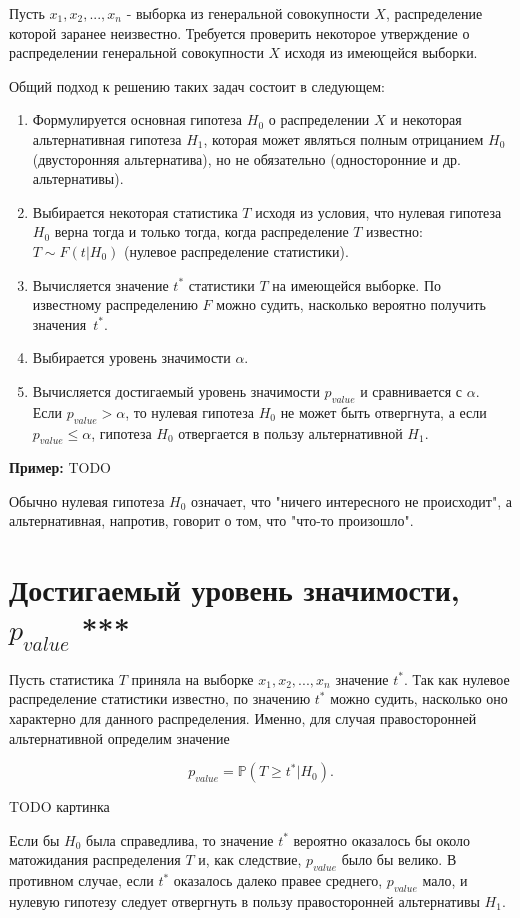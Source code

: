 Пусть $x_1, x_2, ..., x_n$ - выборка из генеральной совокупности $X$, распределение которой заранее неизвестно.
Требуется проверить некоторое утверждение о распределении генеральной совокупности $X$ исходя из имеющейся выборки.

Общий подход к решению таких задач состоит в следующем:
\begin{enumerate}
    \item Формулируется основная гипотеза $H_0$ о распределении $X$ и некоторая альтернативная гипотеза $H_1$, которая может являться полным отрицанием $H_0$ (двусторонняя альтернатива), но не обязательно (односторонние и др. альтернативы).
    \item Выбирается некоторая статистика $T$ исходя из условия, что нулевая гипотеза $H_0$ верна тогда и только тогда, когда распределение $T$ известно: $T \sim F(t|H_0)$ (нулевое распределение статистики). 
    \item Вычисляется значение $t^*$ статистики $T$ на имеющейся выборке. По известному распределению $F$ можно судить, насколько вероятно получить значения~$t^*$.
    \item Выбирается уровень значимости $\alpha$.
    \item Вычисляется достигаемый уровень значимости $p_{value}$ и сравнивается с $\alpha$. Если $p_{value} > \alpha$, то нулевая гипотеза $H_0$ не может быть отвергнута, а если $p_{value} \leqslant \alpha$, гипотеза $H_0$ отвергается в пользу альтернативной $H_1$.
\end{enumerate}

\textbf{Пример:} TODO

Обычно нулевая гипотеза $H_0$ означает, что "ничего интересного не происходит", а альтернативная, напротив, говорит о том, что "что-то произошло".

\section{Достигаемый уровень значимости, $p_{value}$ ***}

Пусть статистика $T$ приняла на выборке $x_1, x_2, ..., x_n$ значение $t^*$. Так как нулевое распределение статистики известно, по значению $t^*$ можно судить, насколько оно характерно для данного распределения. Именно, для случая правосторонней альтернативной определим значение

$$
p_{value} = \mathbb{P}(T \geqslant t^* | H_0).
$$

TODO картинка

Если бы $H_0$ была справедлива, то значение $t^*$ вероятно оказалось бы около матожидания распределения $T$ и, как следствие, $p_{value}$ было бы велико. В противном случае, если $t^*$ оказалось далеко правее среднего, $p_{value}$ мало, и нулевую гипотезу следует отвергнуть в пользу правосторонней альтернативы $H_1$.

